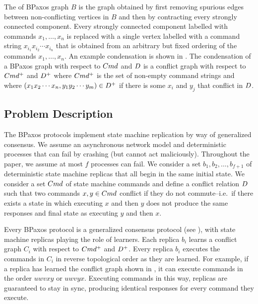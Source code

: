 The  of BPaxos graph $B$ is the graph obtained by first
removing spurious edges between non-conflicting vertices in $B$ and then by
contracting every strongly connected component. Every strongly connected
component labelled with commands $x_1, \ldots, x_n$ is replaced with a single
vertex labelled with a command string $x_{i_1} x_{i_2} \cdots x_{i_n}$ that is
obtained from an arbitrary but fixed ordering of the commands $x_1, \ldots,
x_n$. An example condensation is shown in .
%
The condensation of a BPaxos graph with respect to $Cmd$ and $D$ is
a conflict graph with respect to $Cmd^+$ and $D^+$ where $Cmd^+$ is
the set of non-empty command strings and where $(x_1 x_2 \cdots x_n, y_1 y_2
\cdots y_m) \in D^+$ if there is some $x_i$ and $y_j$ that conflict in
$D$.

\subsection{Problem Description}
The BPaxos protocols implement state machine replication by way of generalized
consensus. We assume an asynchronous network model and deterministic processes
that can fail by crashing (but cannot act maliciously). Throughout the paper,
we assume at most $f$ processes can fail.  We consider a set $b_1, b_2, \ldots,
b_{f+1}$ of deterministic state machine replicas that all begin in the same
initial state. We consider a set $Cmd$ of state machine commands and define a
conflict relation $D$ such that two commands $x, y \in Cmd$ conflict
if they do not commute--i.e.\ if there exists a state in which executing $x$
and then $y$ does not produce the same responses and final state as executing
$y$ and then $x$.

Every BPaxos protocol is a generalized consensus protocol (see
), with state machine replicas playing the role of
learners. Each replica $b_i$ learns a conflict graph $C_i$ with respect to
$Cmd^+$ and $D^+$. Every replica $b_i$ executes the commands in $C_i$
in reverse topological order as they are learned. For example, if a replica has
learned the conflict graph shown in , it can execute
commands in the order $uwvxy$ or $uwvyx$.  Executing commands in this way,
replicas are guaranteed to stay in sync, producing identical responses for
every command they execute.


